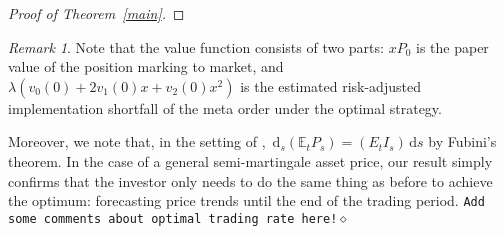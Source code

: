 \documentclass[11pt]{article}
\theoremstyle{definition}
\theoremstyle{remark}
\newtheorem{rem}[thm]{Remark}
\newcommand{\E}{\mathbb{E}} %
\newcommand{\close}{\hspace*{\fill}$\diamond$}
\newcommand{\de}{\,\mathrm{d}}
\begin{document}
\begin{proof}[Proof of Theorem~\ref{main}]
\end{proof}

\begin{rem}
Note that the value function consists of two parts: $xP_0$ is the paper value of the position marking to market, and $\lambda(v_0(0)+2v_1(0)x+v_2(0)x^2)$ is the estimated risk-adjusted implementation shortfall of the meta order under the optimal strategy.

Moreover, we note that, in the setting of \cite{lehalle2017incorporating}, $\de_s(\E_t P_s) = (E_t I_s)\de s$ by Fubini's theorem. In the case of a general semi-martingale asset price, our result simply confirms that the investor only needs to do the same thing as before to achieve the optimum: forecasting price trends until the end of the trading period. \texttt{Add some comments about optimal trading rate here!}\close
\end{rem}
\end{document}
